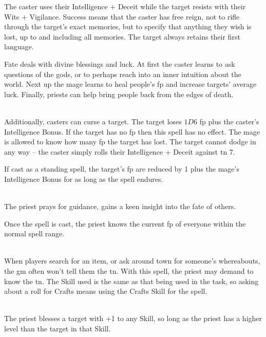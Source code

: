 \documentclass[titlepage,a4paper,openany]{book}
\begin{document}
\begin{multicols}{2}
The caster uses their Intelligence + Deceit while the target resists with their Wits + Vigilance. Success means that the caster has free reign, not to rifle through the target's exact memories, but to specify that anything they wish is lost, up to and including all memories. The target always retains their first language.

\end{multicols}

Fate deals with divine blessings and luck. At first the caster learns to ask questions of the gods, or to perhaps reach into an inner intuition about the world. Next up the mage learns to heal people's \gls{fp} and increase targets' average luck. Finally, priests can help bring people back from the edges of death.
\begin{multicols}{2}

\spelllevel

\\
Additionally, casters can curse a target. The target loses $1D6$ \gls{fp} plus the caster's Intelligence Bonus. If the target has no \gls{fp} then this spell has no effect. The mage is allowed to know how many \gls{fp} the target has lost. The target cannot dodge in any way -- the caster simply rolls their Intelligence + Deceit against \gls{tn} 7.

If cast as a standing spell, the target's \gls{fp} are reduced by 1 plus the mage's Intelligence Bonus for as long as the spell endures.

\\
The priest prays for guidance, gains a keen insight into the fate of others.

Once the spell is cast, the priest knows the current \gls{fp} of everyone within the normal spell range.

\\
When players search for an item, or ask around town for someone's whereabouts, the \gls{gm} often won't tell them the \gls{tn}.  With this spell, the priest may demand to know the \gls{tn}.  The Skill used is the same as that being used in the task, so asking about a roll for Crafts means using the Crafts Skill for the spell.

\\
The priest blesses a target with +1 to any Skill, so long as the priest has a higher level than the target in that Skill.


\end{multicols}
\end{document}

